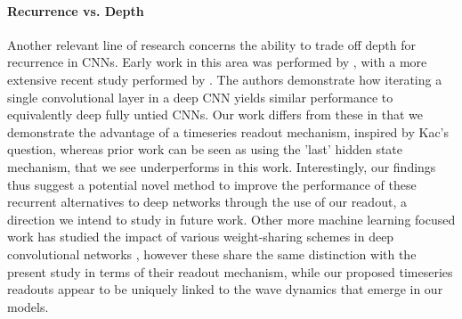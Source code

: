 \vspace{-4mm}
\paragraph{Recurrence vs. Depth}
Another relevant line of research concerns the ability to trade off depth for recurrence in CNNs. 
Early work in this area was performed by \citet{liao2020bridginggapsresiduallearning}, with a more extensive recent study performed by \citet{schwarzschild2022the}. The authors demonstrate how iterating a single convolutional layer in a deep CNN yields similar performance to equivalently deep fully untied CNNs. Our work differs from these in that we demonstrate the advantage of a timeseries readout mechanism, inspired by Kac's question, whereas prior work can be seen as using the 'last' hidden state mechanism, that we see underperforms in this work. Interestingly, our findings thus suggest a potential novel method to improve the performance of these recurrent alternatives to deep networks through the use of our readout, a direction we intend to study in future work. Other more machine learning focused work has studied the impact of various weight-sharing schemes in deep convolutional networks \citep{eigen2014understandingdeeparchitecturesusing, jastrzębski2018residualconnectionsencourageiterative, boulch2017sharesnetreducingresidualnetwork}, however these share the same distinction with the present study in terms of their readout mechanism, while our proposed timeseries readouts appear to be uniquely linked to the wave dynamics that emerge in our models. 


